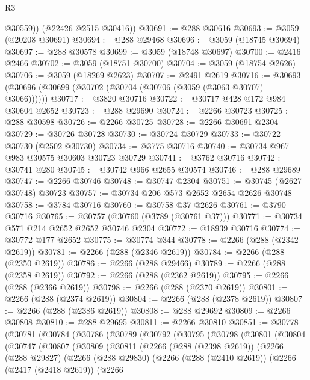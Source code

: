 \begin{lexlean}{R3}
\begin{coremodule}
          @30559))
      (@22426 @2515 @30416))
@30691 := @288 @30616
@30693 := @3059 (@20208 @30691)
@30694 := @288 @29468
@30696 := @3059 (@18745 @30694)
@30697 := @288 @30578
@30699 := @3059 (@18748 @30697)
@30700 := @2416 @2466
@30702 := @3059 (@18751 @30700)
@30704 := @3059 (@18754 @2626)
@30706 := @3059 (@18269 @2623)
@30707 := @2491 @2619
@30716 := @30693 (@30696 (@30699 (@30702 (@30704 (@30706 (@3059 (@3063 @30707) @3066))))))
@30717 := @3820 @30716
@30722 := @30717 @428 @172 @984 @30604 @2652
@30723 := @288 @29690
@30724 := @2266 @30723
@30725 := @288 @30598
@30726 := @2266 @30725
@30728 := @2266 @30691 @2304
@30729 := @30726 @30728
@30730 := @30724 @30729
@30733 := @30722 @30730 (@2502 @30730)
@30734 := @3775 @30716
@30740 := @30734 @967 @983 @30575 @30603 @30723 @30729
@30741 := @3762 @30716
@30742 := @30741 @280
@30745 := @30742 @966 @2655 @30574
@30746 := @288 @29689
@30747 := @2266 @30746
@30748 := @30747 @2304
@30751 := @30745 (@2627 @30748) @30723
@30757 := @30734 @206 @573 @2652 @2654 @2626 @30748
@30758 := @3784 @30716
@30760 := @30758 @37 @2626
@30761 := @3790 @30716
@30765 := @30757 (@30760 (@3789 (@30761 @37)))
@30771 := @30734 @571 @214 @2652 @2652 @30746 @2304
@30772 := @18939 @30716
@30774 := @30772 @177 @2652
@30775 := @30774 @344
@30778 := @2266 (@288 (@2342 @2619))
@30781 := @2266 (@288 (@2346 @2619))
@30784 := @2266 (@288 (@2350 @2619))
@30786 := @2266 (@288 @29466)
@30789 := @2266 (@288 (@2358 @2619))
@30792 := @2266 (@288 (@2362 @2619))
@30795 := @2266 (@288 (@2366 @2619))
@30798 := @2266 (@288 (@2370 @2619))
@30801 := @2266 (@288 (@2374 @2619))
@30804 := @2266 (@288 (@2378 @2619))
@30807 := @2266 (@288 (@2386 @2619))
@30808 := @288 @29692
@30809 := @2266 @30808
@30810 := @288 @29695
@30811 := @2266 @30810
@30851 := @30778
    (@30781
      (@30784
        (@30786
          (@30789
            (@30792
              (@30795
                (@30798
                  (@30801
                    (@30804
                      (@30747
                        (@30807
                          (@30809
                            (@30811
                              (@2266
                                (@288 (@2398 @2619))
                                (@2266
                                  (@288 @29827)
                                  (@2266
                                    (@288 @29830)
                                    (@2266
                                      (@288 (@2410 @2619))
                                      (@2266
                                        (@2417 (@2418 @2619))
                                        (@2266

\end{coremodule}
\end{lexlean}
